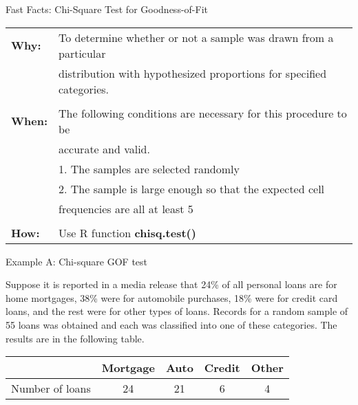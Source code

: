 \documentclass[12pt,ignorenonframetext,aspectratio=169]{beamer}
\begin{document}
\begin{frame}{Fast Facts: Chi-Square Test for Goodness-of-Fit}

\begin{table}
        \centering
        \begin{tabular}{ll}
        \bf{Why}: & To determine whether or not a sample was drawn from a particular  \\ 
                  & distribution with hypothesized proportions for specified categories. \\
                  &  \\
        \bf{When}: & The following conditions are necessary for this procedure to be \\
                  & accurate and valid.  \\
                  & \hspace{1em} 1. The samples are selected randomly \\
                  & \hspace{1em} 2. The sample is large enough so that the expected cell   \\
                  & \hspace{2.3em} frequencies are all at least 5 \\
                  &  \\
        \bf{How}: & Use R function \bf{chisq.test()}  \\
        \end{tabular}
\end{table}


\end{frame}

\begin{frame}{Example A: Chi-square GOF test}

Suppose it is reported in a media release that 24\% of all personal
loans are for home mortgages, 38\% were for automobile purchases, 18\%
were for credit card loans, and the rest were for other types of loans.
Records for a random sample of 55 loans was obtained and each was
classified into one of these categories. The results are in the
following table.

\begin{table}
\centering
\begin{tabular}{r|c|c|c|c}
 & Mortgage & Auto & Credit & Other  \\
\hline
Number of loans & 24 & 21 & 6 & 4 \\
\end{tabular}
\end{table}

\note{}

\end{frame}
\end{document}
